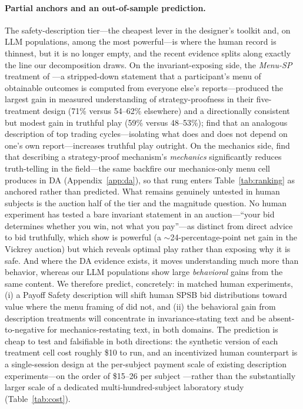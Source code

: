 \paragraph{Partial anchors and an out-of-sample prediction.} The safety-description tier---the cheapest lever in the designer's toolkit and, on LLM populations, among the most powerful---is where the human record is thinnest, but it is no longer empty, and the recent evidence splits along exactly the line our decomposition draws. On the invariant-exposing side, the \emph{Menu-SP} treatment of \citet{gonczarowski2024describing}---a stripped-down statement that a participant's menu of obtainable outcomes is computed from everyone else's reports---produced the largest gain in measured understanding of strategy-proofness in their five-treatment design (71\% versus 54--62\% elsewhere) and a directionally consistent but modest gain in truthful play (59\% versus 48--53\%); \citet{katuscak2024simpler} find that an analogous description of top trading cycles---isolating what does and does not depend on one's own report---increases truthful play outright. On the mechanics side, \citet{guillen2018effectiveness} find that describing a strategy-proof mechanism's \emph{mechanics} significantly reduces truth-telling in the field---the same backfire our mechanics-only menu cell produces in DA (Appendix~\ref{app:da}), so that rung enters Table~\ref{tab:ranking} as anchored rather than predicted. What remains genuinely untested in human subjects is the auction half of the tier and the magnitude question. No human experiment has tested a bare invariant statement in an auction---``your bid determines whether you win, not what you pay''---as distinct from direct advice to bid truthfully, which \citet{masuda2022net} show is powerful (a $\sim$24-percentage-point net gain in the Vickrey auction) but which reveals optimal play rather than exposing why it is safe. And where the DA evidence exists, it moves understanding much more than behavior, whereas our LLM populations show large \emph{behavioral} gains from the same content. We therefore predict, concretely: in matched human experiments, (i) a Payoff Safety description will shift human SPSB bid distributions toward value where the menu framing of \citet{gonczarowski2023strategyproofness} did not, and (ii) the behavioral gain from description treatments will concentrate in invariance-stating text and be absent-to-negative for mechanics-restating text, in both domains. The prediction is cheap to test and falsifiable in both directions: the synthetic version of each treatment cell cost roughly \$10 to run, and an incentivized human counterpart is a single-session design at the per-subject payment scale of existing description experiments---on the order of \$15--26 per subject \citep{gonczarowski2024describing}---rather than the substantially larger scale of a dedicated multi-hundred-subject laboratory study (Table~\ref{tab:cost}).

